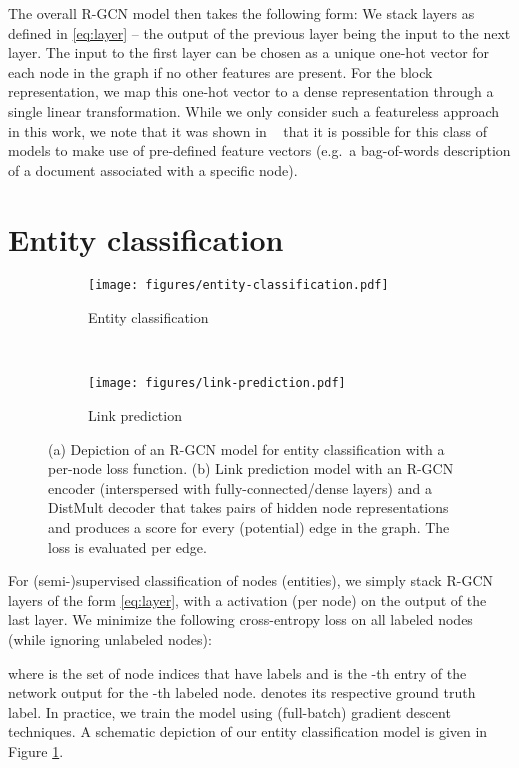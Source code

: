 \documentclass[letterpaper]{article} \usepackage{aaai18}  \usepackage{times}  \usepackage{helvet}  \usepackage{courier}  \usepackage{url}  \usepackage{graphicx}  \frenchspacing
\newcommand{\citet}[1]{\citeauthor{#1}~\shortcite{#1}}
\begin{document}
The overall R-GCN model then takes the following form: We stack  layers as defined in \eqref{eq:layer} -- the output of the previous layer being the input to the next layer. The input to the first layer can be chosen as a unique one-hot vector for each node in the graph if no other features are present. For the block representation, we map this one-hot vector to a dense representation through a single linear transformation. While we only consider such a featureless approach in this work, we note that it was shown in \citet{kipf2016semi} that it is possible for this class of models to make use of pre-defined feature vectors (e.g.~a bag-of-words description of a document associated with a specific node).
 
\section{Entity classification}
\begin{figure}[t!]
    \centering
    \begin{subfigure}[b]{0.4\linewidth}
      \centering
      \texttt{[image: figures/entity-classification.pdf]}
      \caption{Entity classification}        
      \label{fig:model-b}
    \end{subfigure}~\quad
    \begin{subfigure}[b]{0.49\linewidth}
        \centering
        \texttt{[image: figures/link-prediction.pdf]}
        \caption{Link prediction}
        \label{fig:model-c}
    \end{subfigure}
    \caption{(a) Depiction of an R-GCN model for entity classification with a per-node loss function. (b) Link prediction model with an R-GCN encoder (interspersed with fully-connected/dense layers) and a DistMult decoder that takes pairs of hidden node representations and produces a score for every (potential) edge in the graph. The loss is evaluated per edge.}
\end{figure}

For (semi-)supervised classification of nodes (entities), we simply stack R-GCN layers of the form \eqref{eq:layer}, with a  activation (per node) on the output of the last layer. We minimize the following cross-entropy loss on all labeled nodes (while ignoring unlabeled nodes):
 
where  is the set of node indices that have labels and  is the -th entry of the network output for the -th labeled node.  denotes its respective ground truth label. In practice, we train the model using (full-batch) gradient descent techniques. A schematic depiction of our entity classification model is given in Figure \ref{fig:model-b}. 
\end{document}
